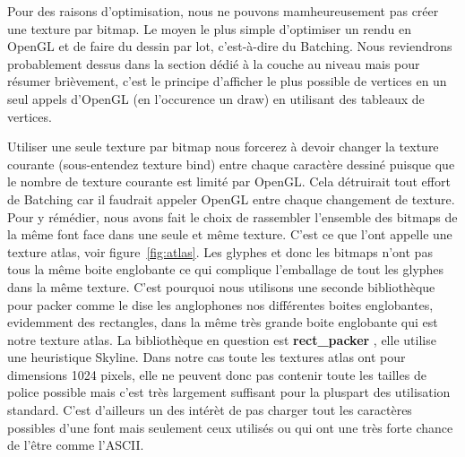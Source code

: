 \documentclass[12pt]{article}
\begin{document}
Pour des raisons d'optimisation, nous ne pouvons mamheureusement pas créer une texture par bitmap. Le moyen le plus simple d'optimiser un rendu en OpenGL et de faire du dessin par lot,
c'est-à-dire du Batching. Nous reviendrons probablement dessus dans la section dédié à la couche au niveau mais pour résumer brièvement, c'est le principe d'afficher le plus
possible de vertices en un seul appels d'OpenGL (en l'occurence un draw) en utilisant des tableaux de vertices.

Utiliser une seule texture par bitmap nous forcerez à devoir changer la texture courante (sous-entendez texture bind) entre chaque caractère dessiné puisque que le nombre de texture
courante est limité par OpenGL. Cela détruirait tout effort de Batching car il faudrait appeler OpenGL entre chaque changement de texture.
Pour y rémédier, nous avons fait le choix de rassembler l'ensemble des bitmaps de la même font face dans une seule et même texture.
C'est ce que l'ont appelle une texture atlas, voir figure~\ref{fig:atlas}.
Les glyphes et donc les bitmaps n'ont pas tous la même boite englobante ce qui complique l'emballage de tout les glyphes dans la même texture.
C'est pourquoi nous utilisons une seconde bibliothèque pour \og packer \fg{} comme le dise les anglophones nos différentes boites englobantes, evidemment des rectangles, dans la même très grande boite
englobante qui est notre texture atlas. La bibliothèque en question est \textbf{rect\_packer} \cite{rect-packer}, elle utilise une heuristique Skyline. Dans notre cas toute les textures atlas
ont pour dimensions 1024 pixels, elle ne peuvent donc pas contenir toute les tailles de police possible mais c'est très largement suffisant pour la pluspart des utilisation standard.
C'est d'ailleurs un des intérèt de pas charger tout les caractères possibles d'une font mais seulement ceux utilisés ou qui ont une très forte chance de l'être comme l'ASCII.
\end{document}
